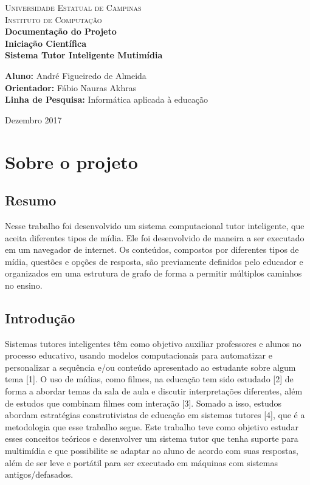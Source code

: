\documentclass{article}
\begin{document}
\begin{center}
{\LARGE \textsc{Universidade Estatual de Campinas}}\\[0.2cm]
{\LARGE \textsc{Instituto de Computação}}\\[3.5cm]
{\Large \textbf{Documentação do Projeto \\[0.2cm] Iniciação Científica}}\\[3.5cm]
{\large \textbf{Sistema Tutor Inteligente Mutimídia}}\\[4cm]
\end{center}

\begin{flushleft}
\textbf{Aluno:} André Figueiredo de Almeida \\
\textbf{Orientador:} Fábio Nauras Akhras \\
\textbf{Linha de Pesquisa:} Informática aplicada à educação
\vfill
\end{flushleft}

\begin{center}
Dezembro 2017
\end{center}

\newpage
{}

\section{Sobre o projeto}
\subsection{Resumo}
Nesse trabalho foi desenvolvido um sistema computacional tutor inteligente, que aceita diferentes tipos de mídia. Ele foi desenvolvido de maneira a ser executado em um navegador de internet. Os conteúdos, compostos por diferentes tipos de mídia, questões e opções de resposta, são previamente definidos pelo educador e organizados em uma estrutura de grafo de forma a permitir múltiplos caminhos no ensino.

\subsection{Introdução}
Sistemas tutores inteligentes têm como objetivo auxiliar professores e alunos no processo educativo, usando modelos computacionais para automatizar e personalizar a sequência e/ou conteúdo apresentado ao estudante sobre algum tema [1]. O uso de mídias, como filmes, na educação tem sido estudado [2] de forma a abordar temas da sala de aula e discutir interpretações diferentes, além de estudos que combinam filmes com interação [3]. Somado a isso, estudos abordam estratégias construtivistas de educação em sistemas tutores [4], que é a metodologia que esse trabalho segue. Este trabalho teve como objetivo estudar esses conceitos teóricos e desenvolver um sistema tutor que tenha suporte para multimídia e que possibilite se adaptar ao aluno de acordo com suas respostas, além de ser leve e portátil para ser executado em máquinas com sistemas antigos/defasados.
\end{document}
